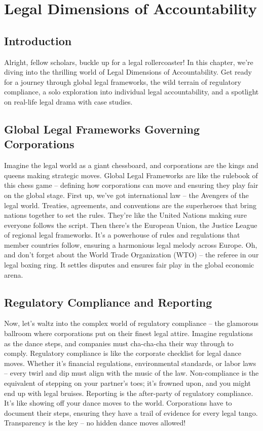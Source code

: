 \documentclass[
  letterpaper,
  DIV=11,
  numbers=noendperiod]{scrreprt}
\begin{document}
\section{Legal Dimensions of
Accountability}\label{legal-dimensions-of-accountability}

\subsection{Introduction}\label{introduction-4}

Alright, fellow scholars, buckle up for a legal rollercoaster! In this
chapter, we're diving into the thrilling world of Legal Dimensions of
Accountability. Get ready for a journey through global legal frameworks,
the wild terrain of regulatory compliance, a solo exploration into
individual legal accountability, and a spotlight on real-life legal
drama with case studies.

\subsection{Global Legal Frameworks Governing
Corporations}\label{global-legal-frameworks-governing-corporations}

Imagine the legal world as a giant chessboard, and corporations are the
kings and queens making strategic moves. Global Legal Frameworks are
like the rulebook of this chess game -- defining how corporations can
move and ensuring they play fair on the global stage. First up, we've
got international law -- the Avengers of the legal world. Treaties,
agreements, and conventions are the superheroes that bring nations
together to set the rules. They're like the United Nations making sure
everyone follows the script. Then there's the European Union, the
Justice League of regional legal frameworks. It's a powerhouse of rules
and regulations that member countries follow, ensuring a harmonious
legal melody across Europe. Oh, and don't forget about the World Trade
Organization (WTO) -- the referee in our legal boxing ring. It settles
disputes and ensures fair play in the global economic arena.

\subsection{Regulatory Compliance and
Reporting}\label{regulatory-compliance-and-reporting}

Now, let's waltz into the complex world of regulatory compliance -- the
glamorous ballroom where corporations put on their finest legal attire.
Imagine regulations as the dance steps, and companies must cha-cha-cha
their way through to comply. Regulatory compliance is like the corporate
checklist for legal dance moves. Whether it's financial regulations,
environmental standards, or labor laws -- every twirl and dip must align
with the music of the law. Non-compliance is the equivalent of stepping
on your partner's toes; it's frowned upon, and you might end up with
legal bruises. Reporting is the after-party of regulatory compliance.
It's like showing off your dance moves to the world. Corporations have
to document their steps, ensuring they have a trail of evidence for
every legal tango. Transparency is the key -- no hidden dance moves
allowed!
\end{document}
